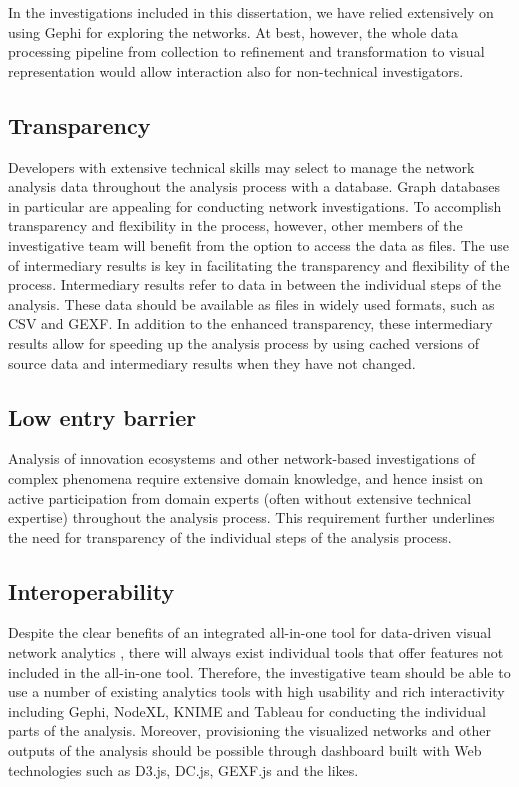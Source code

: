 In the investigations included in this dissertation, we have relied extensively on using Gephi for exploring the networks. At best, however, the whole data processing pipeline from collection to refinement and transformation to visual representation would allow interaction also for non-technical investigators.

\subsection{Transparency}

Developers with extensive technical skills may select to manage the network analysis data throughout the analysis process with a database. Graph databases in particular are appealing for conducting network investigations. To accomplish transparency and flexibility in the process, however, other members of the investigative team will benefit from the option to access the data as files. The use of intermediary results is key in facilitating the transparency and flexibility of the process. Intermediary results refer to data in between the individual steps of the analysis. These data should be available as files in widely used formats, such as CSV and GEXF. In addition to the enhanced transparency, these intermediary results allow for speeding up the analysis process by using cached versions of source data and intermediary results when they have not changed.

\subsection{Low entry barrier}

Analysis of innovation ecosystems and other network-based investigations of complex phenomena require extensive domain knowledge, and hence insist on active participation from domain experts (often without extensive technical expertise) throughout the analysis process. This requirement further underlines the need for transparency of the individual steps of the analysis process.

\subsection{Interoperability} 

Despite the clear benefits of an integrated all-in-one tool for data-driven visual network analytics \citep[cf.][]{Freeman2000VisualizingNetworks}, there will always exist individual tools that offer features not included in the all-in-one tool. Therefore, the investigative team should be able to use a number of existing analytics tools with high usability and rich interactivity including Gephi, NodeXL, KNIME and Tableau for conducting the individual parts of the analysis. Moreover, provisioning the visualized networks and other outputs of the analysis should be possible through dashboard built with Web technologies such as D3.js, DC.js, GEXF.js and the likes. 


